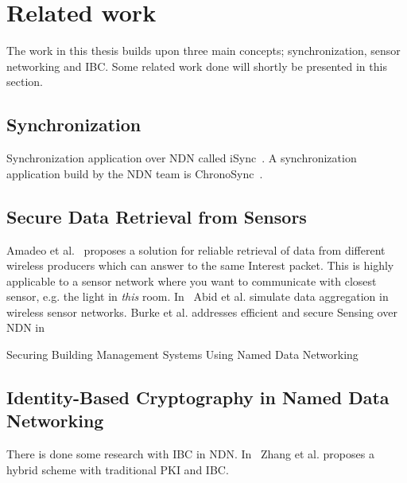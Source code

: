 \section{Related work}
The work in this thesis builds upon three main concepts; synchronization, sensor networking and \gls{IBC}. 
Some related work done will shortly be presented in this section.

\subsection{Synchronization}
Synchronization application over \gls{NDN} called iSync~\cite{DBLP:conf/acmicn/FuAC14}.
A synchronization application build by the \gls{NDN} team is ChronoSync~\cite{DBLP:conf/icnp/ZhuA13}.

\subsection{Secure Data Retrieval from Sensors}
Amadeo et al.~\cite{DBLP:conf/acmicn/AmadeoCM14} proposes a solution for reliable retrieval of data from different wireless producers which can answer to the same Interest packet. This is highly applicable to a sensor network where you want to communicate with closest sensor, e.g. the light in \textit{this} room.
In~\cite{DBLP:conf/noms/AbidySLF14} Abid et al. simulate data aggregation in wireless sensor networks.
Burke et al. addresses efficient and secure Sensing over \gls{NDN} in~\cite{DBLP:conf/nca/BurkeGNT14}

Securing Building Management Systems Using Named Data Networking~\cite{DBLP:journals/network/ShangDMBZ14}

\subsection{Identity-Based Cryptography in Named Data Networking}
There is done some research with \gls{IBC} in \gls{NDN}. In~\cite{DBLP:conf/icnp/ZhangCXWSW11} Zhang et al. proposes a hybrid scheme with traditional \gls{PKI} and \gls{IBC}.


